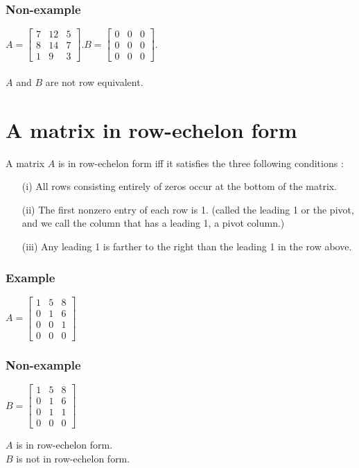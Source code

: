 \documentclass[a4paper,12pt]{article}
\begin{document}
\subsubsection*{Non-example}
$
A= \begin{bmatrix}
    7 & 12 & 5 \\
    8 & 14 & 7 \\
    1 & 9 & 3
  \end{bmatrix}. B=\begin{bmatrix}
    0 & 0 & 0 \\  
    0 & 0 & 0 \\
    0 & 0 & 0
  \end{bmatrix}.
$ 
\\ \\ $A$ and $B$ are not row equivalent.
\section{A matrix in row-echelon form}
A matrix $A$ is in row-echelon form iff it satisfies the three following conditions :
\begin{itemize}
  \item [(i)] All rows consisting entirely of zeros occur at the bottom of the matrix.
  \item [(ii)] The first nonzero entry of each row is 1. (called the leading 1 or the pivot, and we call the column that has a leading 1, a pivot column.)
  \item [(iii)] Any leading 1 is farther to the right than the leading 1 in the row above.
\end{itemize}

\begin{multicols}{2}
  \subsubsection*{Example}
  $
  A=\begin{bmatrix}
    1 & 5 & 8 \\
    0 & 1 & 6 \\
    0 & 0 & 1 \\
    0 & 0 & 0
  \end{bmatrix}
  $
  \subsubsection*{Non-example}
  $B=\begin{bmatrix}
    1 & 5 & 8 \\
    0 & 1 & 6 \\
    0 & 1 & 1 \\
    0 & 0 & 0
  \end{bmatrix}$
\end{multicols}

\begin{multicols}{2}
  $A$ is in row-echelon form. \\
  $B$ is not in row-echelon form.
\end{multicols}
\end{document}
